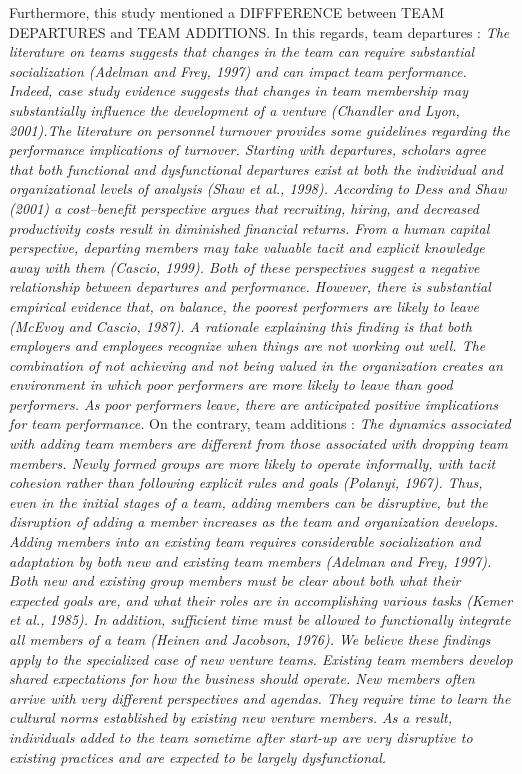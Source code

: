 \begin{itemize}
\begin{itemize}
Furthermore, this study mentioned a DIFFFERENCE between TEAM DEPARTURES and TEAM ADDITIONS.
In this regards, team departures : \textit{The literature on teams suggests that changes in the team can require substantial socialization (Adelman and Frey, 1997) and can impact team performance. Indeed, case study evidence suggests that changes in team membership may substantially influence the development of a venture (Chandler and Lyon, 2001).The literature on personnel turnover provides some guidelines regarding the performance implications of turnover. Starting with departures, scholars agree that both functional and dysfunctional departures exist at both the individual and organizational levels of analysis (Shaw et al., 1998). According to Dess and Shaw (2001) a cost–benefit perspective argues that recruiting, hiring, and decreased productivity costs result in diminished financial returns. From a human capital perspective, departing members may take valuable tacit and explicit knowledge away with them (Cascio, 1999). Both of these perspectives suggest a negative relationship between departures and performance. However, there is substantial empirical evidence that, on balance, the poorest performers are likely to leave (McEvoy and Cascio, 1987). A rationale explaining this finding is that both employers and employees recognize when things are not working out well. The combination of not achieving and not being valued in the organization creates an environment in which poor performers are more likely to leave than good performers. As poor performers leave, there are anticipated positive implications for team performance.} On the contrary, team additions : \textit{The dynamics associated with adding team members are different from those associated with dropping team members. Newly formed groups are more likely to operate informally, with tacit cohesion rather than following explicit rules and goals (Polanyi, 1967). Thus, even in the initial stages of a team, adding members can be disruptive, but the disruption of adding a member increases as the team and organization develops. Adding members into an existing team requires considerable socialization and adaptation by both new and existing team members (Adelman and Frey, 1997). Both new and existing group members must be clear about both what their expected goals are, and what their roles are in accomplishing various tasks (Kemer et al., 1985). In addition, sufficient time must be allowed to functionally integrate all members of a team (Heinen and Jacobson, 1976). We believe these findings apply to the specialized case of new venture teams. Existing team members develop shared expectations for how the business should operate. New members often arrive with very different perspectives and agendas. They require time to learn the cultural norms established by existing new venture members. As a result, individuals added to the team sometime after start-up are very disruptive to existing practices and are expected to be largely dysfunctional.}


\end{itemize}
\end{itemize}

